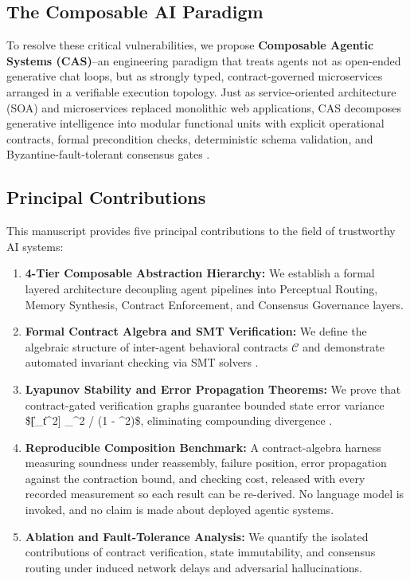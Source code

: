 \documentclass[10pt,journal,compsoc,twocolumn]{IEEEtran}
\begin{document}
\subsection{The Composable AI Paradigm}


To resolve these critical vulnerabilities, we propose \textbf{Composable Agentic Systems (CAS)}--an engineering paradigm that treats agents not as open-ended generative chat loops, but as strongly typed, contract-governed microservices arranged in a verifiable execution topology. Just as service-oriented architecture (SOA) and microservices replaced monolithic web applications, CAS decomposes generative intelligence into modular functional units with explicit operational contracts, formal precondition checks, deterministic schema validation, and Byzantine-fault-tolerant consensus gates \cite{crossref_10_1109_access_2026_3656309,crossref_10_1145_3689096_3689462}.


\subsection{Principal Contributions}


This manuscript provides five principal contributions to the field of trustworthy AI systems:
\begin{enumerate}
  \item \textbf{4-Tier Composable Abstraction Hierarchy:} We establish a formal layered architecture decoupling agent pipelines into Perceptual Routing, Memory Synthesis, Contract Enforcement, and Consensus Governance layers.
  \item \textbf{Formal Contract Algebra and SMT Verification:} We define the algebraic structure of inter-agent behavioral contracts $\mathcal{C}$ and demonstrate automated invariant checking via SMT solvers \cite{arxiv_2404_01131}.
  \item \textbf{Lyapunov Stability and Error Propagation Theorems:} We prove that contract-gated verification graphs guarantee bounded state error variance \$[\|\_t\|^2] \le \sigma\_{\max}^2 / (1 - \rho^2)\$, eliminating compounding divergence \cite{arxiv_2501_02497}.
  \item \textbf{Reproducible Composition Benchmark:} A contract-algebra harness measuring soundness under reassembly, failure position, error propagation against the contraction bound, and checking cost, released with every recorded measurement so each result can be re-derived. No language model is invoked, and no claim is made about deployed agentic systems.
  \item \textbf{Ablation and Fault-Tolerance Analysis:} We quantify the isolated contributions of contract verification, state immutability, and consensus routing under induced network delays and adversarial hallucinations.
\end{enumerate}
\end{document}
